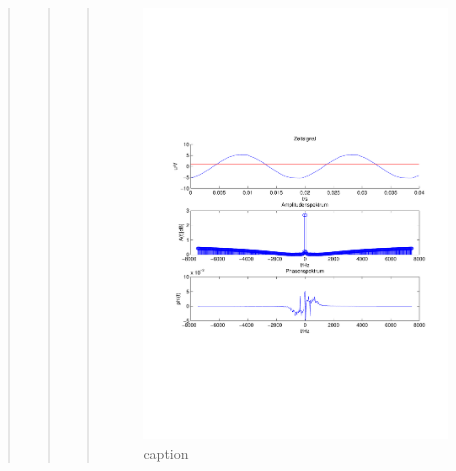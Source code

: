 \begin{quote}
\begin{quote}
\begin{quote}
            \begin{figure}[H]
            \centering
                \includegraphics[scale=0.7, trim = 1.5cm 7cm 1.5cm 8.5cm, clip]{./Bilder/OberwellenmessungspektrumTHD00332.pdf}
                    \caption{caption}
            \end{figure}
    

    	\end{quote} %
    
    \end{quote}  %
			
\end{quote}%
